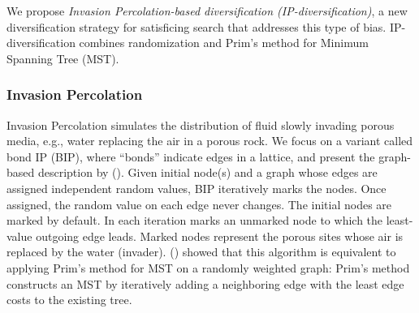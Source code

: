 We propose \;\emph{Invasion Percolation-based diversification (IP-diversification)}, a new diversification strategy for satisficing search that addresses this type of bias.
IP-diversification combines randomization and Prim's method \cite{prim1957shortest} for Minimum Spanning Tree (MST).

\subsubsection{Invasion Percolation}

Invasion Percolation \cite{wilkinson1983invasion} simulates the distribution of fluid slowly %
invading porous media, e.g., water replacing the air in a porous rock.
We focus on a variant called bond IP (BIP), where ``bonds'' indicate edges in a lattice, and present the graph-based description by \citeauthor{barabasi1996invasion} (\citeyear{barabasi1996invasion}).
Given initial node(s) and a graph whose edges are assigned independent random values,
BIP iteratively marks the nodes.
Once assigned, the random value on each edge never changes.  The initial nodes are marked by default.
In each iteration marks an unmarked node to which the least-value outgoing edge leads.
Marked nodes represent the porous sites whose air is replaced by the water (invader).
\citeauthor{barabasi1996invasion} (\citeyear{barabasi1996invasion}) showed that
this algorithm is equivalent to applying Prim's method for MST \cite{prim1957shortest} on a randomly weighted graph:
Prim's method constructs an MST by iteratively adding a neighboring edge with the least edge costs
to the existing tree.

